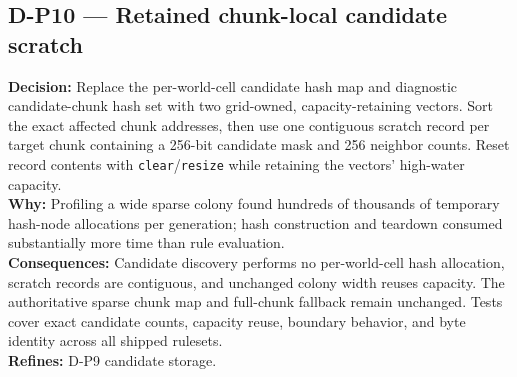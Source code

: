 \subsection*{D-P10 --- Retained chunk-local candidate scratch}
\begin{decisionbox}[title={D-P10 \quad 2026-08-08}]
\textbf{Decision:} Replace the per-world-cell candidate hash map and diagnostic
candidate-chunk hash set with two grid-owned, capacity-retaining vectors. Sort
the exact affected chunk addresses, then use one contiguous scratch record per
target chunk containing a 256-bit candidate mask and 256 neighbor counts. Reset
record contents with \texttt{clear}/\texttt{resize} while retaining the vectors'
high-water capacity.\\
\textbf{Why:} Profiling a wide sparse colony found hundreds of thousands of
temporary hash-node allocations per generation; hash construction and teardown
consumed substantially more time than rule evaluation.\\
\textbf{Consequences:} Candidate discovery performs no per-world-cell hash
allocation, scratch records are contiguous, and unchanged colony width reuses
capacity. The authoritative sparse chunk map and full-chunk fallback remain
unchanged. Tests cover exact candidate counts, capacity reuse, boundary behavior,
and byte identity across all shipped rulesets.\\
\textbf{Refines:} D-P9 candidate storage.
\end{decisionbox}

